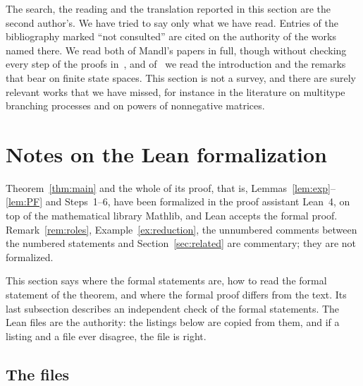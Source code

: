 \documentclass[11pt]{article}
\theoremstyle{definition}
\theoremstyle{remark}
\begin{document}
The search, the reading and the translation reported in this section are the second author's.
We have tried to say only what we have read. Entries of the bibliography marked ``not consulted'' are cited on
the authority of the works named there. We read both of Mandl's papers in full, though without checking every step of
the proofs in~\cite{Mandl59}, and of~\cite{CV} we read the introduction and the remarks that
bear on finite state spaces. This
section is not a survey, and there are surely relevant works that we have missed, for instance
in the literature on multitype branching processes and on powers of nonnegative matrices.

\section{Notes on the Lean formalization}\label{sec:lean}

Theorem~\ref{thm:main} and the whole of its proof, that is, Lemmas~\ref{lem:exp}--\ref{lem:PF} and
Steps~1--6, have been formalized in the proof assistant Lean~4, on top of the mathematical library
Mathlib, and Lean accepts the formal proof. Remark~\ref{rem:roles}, Example~\ref{ex:reduction},
the unnumbered comments between the numbered statements and Section~\ref{sec:related} are
commentary; they are not formalized.

This section says where the formal statements are, how to read the formal statement of the
theorem, and where the formal proof differs from the text. Its last subsection describes an
independent check of the formal statements. The Lean files are the authority: the
listings below are copied from them, and if a listing and a file ever disagree, the file is right.

\subsection{The files}\label{sec:lean:files}
\end{document}
